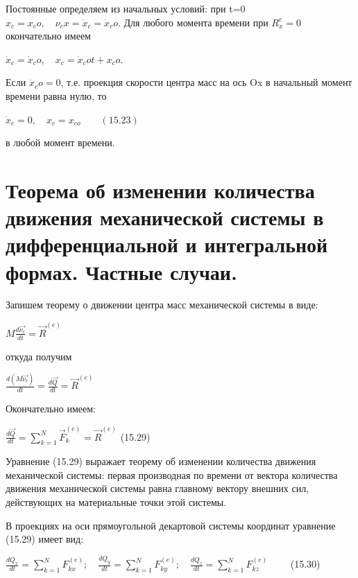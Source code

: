 {\begin{center}
\par Постоянные определяем из начальных условий: при t=0 $x_c = x_co, \quad \nu_cx = \dot x_c = \dot x_co$. Для любого момента времени при $R_x^e = 0$ окончательно имеем

\par $\dot x_c = \dot x_co, \quad x_c = \dot x_co t + x_co$.

\par Если $\dot x_co =0$, т.е. проекция скорости центра масс на ось Ox в начальный момент времени равна нулю, то

\par $\dot x_c = 0, \quad x_c = x_{co} \qquad (15.23)$

\par в любой момент времени.
\end{center}
\section{Теорема об изменении количества движения механической системы в дифференциальной и интегральной формах. Частные случаи.}
\begin{center}
    \par Запишем теорему о движении центра масс механической системы в виде:
    
    \par $M \frac{d\vec{\nu_c}}{dt} = \vec{R}^{(e)}$
    
    \par откуда получим 
    
    \par $\frac{d(M\vec{\nu_c})}{dt} = \frac{d\vec{Q}}{dt} = \vec{R}^{(e)}$
    
    \par Окончательно имеем:
    
    \par $\frac{d\vec{Q}}{dt} = \sum_{k=1}^{N} \vec{F}_{k}^{(e)} = \vec{R}^{(e)} $ \qquad (15.29)

    \par Уравнение (15.29) выражает теорему об изменении количества движения механической системы: первая производная по времени от вектора количества движения механической системы равна главному вектору внешних сил, действующих на материальные точки этой системы.

    \par В проекциях на оси прямоугольной декартовой системы координат уравнение (15.29) имеет вид:

    \par $\frac{dQ_x}{dt} = \sum_{k=1}^{N} {F}_{kx}^{(e)}; \quad \frac{dQ_y}{dt} = \sum_{k=1}^{N} {F}_{ky}^{(e)}; \quad
    \frac{dQ_z}{dt} = \sum_{k=1}^{N} {F}_{kz}^{(e)} \qquad $ (15.30) 


\end{center}}
